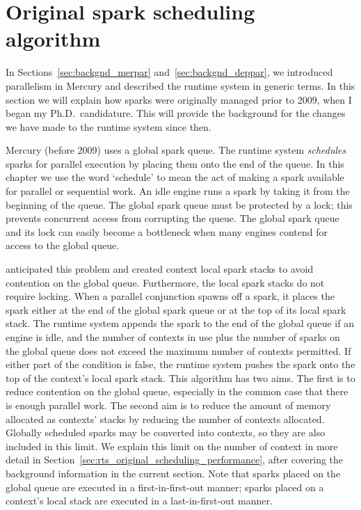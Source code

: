 
\section{Original spark scheduling algorithm}
\label{sec:rts_original_scheduling}

In Sections~\ref{sec:backgnd_merpar} and~\ref{sec:backgnd_deppar},
we introduced parallelism in Mercury and described the runtime system in
generic terms.
In this section we will explain how sparks were originally managed
prior to 2009,
when I began my Ph.D.\ candidature.
This will provide the background for the changes we have made to the
runtime system since then.

Mercury (before 2009) uses a global spark queue.
The runtime system \emph{schedules} sparks for parallel execution by placing
them onto the end of the queue.
In this chapter we use the word `schedule' to mean the act of making a spark
available for parallel or sequential work.
An idle engine runs a spark by taking it from the beginning of the queue.
The global spark queue must be protected by a lock;
this prevents concurrent access from corrupting the queue.
The global spark queue and its lock can easily become a bottleneck when many
engines contend for access to the global queue.

\citet{wang:2006:hons} anticipated this problem and created context local spark
stacks to avoid contention on the global queue.
Furthermore, the local spark stacks do not require locking.
When a parallel conjunction spawns off a spark,
it places the spark either at the end of the global spark queue or at the
top of its local spark stack.
The runtime system appends the spark to the end of the global queue if
an engine is idle, and
the number of contexts in use plus the number of sparks on the global queue
does not exceed the maximum number of contexts permitted.
If either part of the condition is false,
the runtime system pushes the spark onto the top of the context's local
spark stack.
This algorithm has two aims.
The first is to reduce contention on the global queue,
especially in the common case that there is enough parallel work.
The second aim is to reduce the amount of memory allocated
as contexts' stacks by reducing the number of contexts allocated.
Globally scheduled sparks may be converted into contexts,
so they are also included in this limit.
We explain this limit on the number of context in more detail
in Section~\ref{sec:rts_original_scheduling_performance},
after covering the background information in the current section.
Note that sparks placed on the global queue are executed in a
first-in-first-out manner;
sparks placed on a context's local stack are executed in a
last-in-first-out manner.

